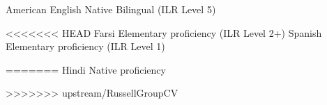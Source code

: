 
\begin{cvskills}

  \cvskill
    {American English} %
    {Native Bilingual (ILR Level 5)} %

  \cvskill
<<<<<<< HEAD
    {Farsi} %
    {Elementary proficiency (ILR Level 2+)} %
  \cvskill
    {Spanish} %
    {Elementary proficiency (ILR Level 1)} %

=======
    {Hindi} %
    {Native proficiency} %
    
>>>>>>> upstream/RussellGroupCV
\end{cvskills}
